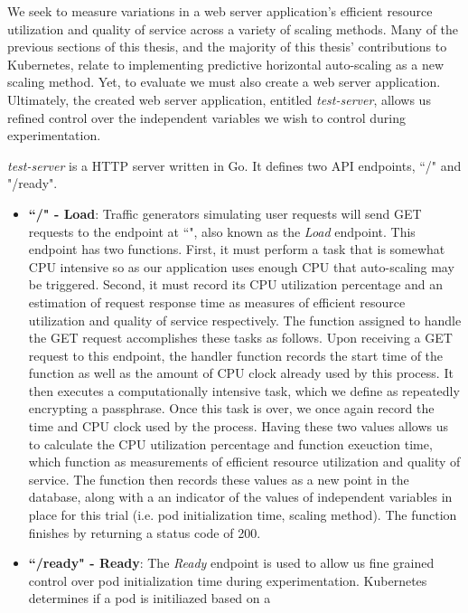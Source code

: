 We seek to measure variations in a web server application's
efficient resource utilization and quality of service across a variety of
scaling methods. Many of the previous sections of this thesis, and the majority
of this thesis' contributions to Kubernetes, relate to implementing predictive
horizontal auto-scaling as a new scaling method. Yet, to evaluate we must also
create a web server application. Ultimately, the created web server application,
entitled \textit{test-server}, allows us refined control over the independent
variables we wish to control during experimentation.

\textit{test-server} is a HTTP server written in Go. It defines two API
endpoints, ``/" and "/ready".

\begin{itemize}
  \item \textbf{``/" - Load}: Traffic generators simulating user requests will
    send GET requests to the endpoint at ``\/", also known as the \textit{Load} endpoint.
    This endpoint has two functions. First, it must perform a task that is
    somewhat CPU intensive so as our application uses enough CPU that
    auto-scaling may be triggered. Second, it must record its CPU utilization
    percentage and an estimation of request response time as measures of
    efficient resource utilization and quality of service respectively. The
    function assigned to handle the GET request accomplishes these tasks as
    follows. Upon receiving a GET request to this endpoint, the handler function
    records the start time of the function as well as the amount of CPU clock
    already used by this process. It then executes a computationally intensive
    task, which we define as repeatedly encrypting a passphrase. Once this task
    is over, we once again record the time and CPU clock used by the process.
    Having these two values allows us to calculate the CPU utilization
    percentage and function exeuction time, which function as measurements of
    efficient resource utilization and quality of service. The function then
    records these values as a new point in the database, along with a
    an indicator of the values of independent variables in place for this trial
    (i.e. pod initialization time, scaling method). The function finishes by
    returning a status code of 200.
  \item \textbf{``/ready" - Ready}: The \textit{Ready} endpoint is used to allow
    us fine grained control over pod initialization time during experimentation.
    Kubernetes determines if a pod is initiliazed based on a

\end{itemize}
